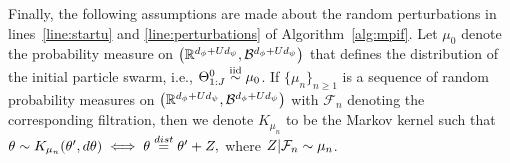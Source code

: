 \vspace{-13mm}
Finally, the following assumptions are made about the random perturbations in lines~\ref{line:startu} and \ref{line:perturbations} of Algorithm~\ref{alg:mpif}.
Let $\mu_0$ denote the probability measure on $\big(\mathbb{R}^{d_\phi + Ud_\psi}, \mathcal{B}^{d_\phi+Ud_\psi}\big)$ that defines the distribution of the initial particle swarm, i.e., $\Theta_{1:J}^0 \overset{\mathrm{iid}}{\sim} \mu_0$. 
If $\{\mu_n\}_{n \geq 1}$ is a sequence of random probability measures \citep{crauel02} on $\big(\mathbb{R}^{d_\phi + Ud_\psi}, \mathcal{B}^{d_\phi+Ud_\psi}\big)$ with $\mathcal{F}_n$ denoting the corresponding filtration, then we denote $K_{\mu_n}$ to be the Markov kernel such that \linebreak $\theta \sim K_{\mu_n}(\theta', d\theta) \iff \theta \overset{dist}{=}\theta' + Z,$ where $Z|\mathcal{F}_n \sim \mu_n$.

